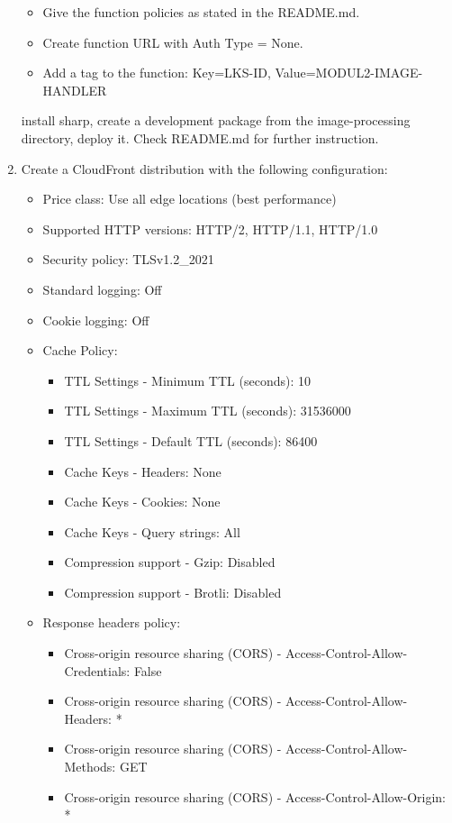 \documentclass{article}
\begin{document}
\begin{enumerate}
\begin{itemize}
    \item Give the function policies as stated in the README.md.
    \item Create function URL with Auth Type = None.
    \item Add a tag to the function: Key=LKS-ID, Value=MODUL2-IMAGE-HANDLER
  \end{itemize}
 install sharp, create a development package from the image-processing directory, deploy it. Check README.md for further instruction.
\item Create a CloudFront distribution with the following configuration:
  \begin{itemize}
    \item Price class: Use all edge locations (best performance)
    \item Supported HTTP versions: HTTP/2, HTTP/1.1, HTTP/1.0
    \item Security policy: TLSv1.2\_2021
    \item Standard logging: Off
    \item Cookie logging: Off
    \item Cache Policy:
    \begin{itemize}
      \item TTL Settings - Minimum TTL (seconds): 10
      \item TTL Settings - Maximum TTL (seconds): 31536000
      \item TTL Settings - Default TTL (seconds): 86400
      \item Cache Keys - Headers: None
      \item Cache Keys - Cookies: None
      \item Cache Keys - Query strings: All
      \item Compression support - Gzip: Disabled
      \item Compression support - Brotli: Disabled
    \end{itemize}
    \item Response headers policy:
    \begin{itemize}
      \item Cross-origin resource sharing (CORS) - Access-Control-Allow-Credentials: False
      \item Cross-origin resource sharing (CORS) - Access-Control-Allow-Headers: *
      \item Cross-origin resource sharing (CORS) - Access-Control-Allow-Methods: GET
      \item Cross-origin resource sharing (CORS) - Access-Control-Allow-Origin: *

\end{itemize}
\end{itemize}
\end{enumerate}
\end{document}
